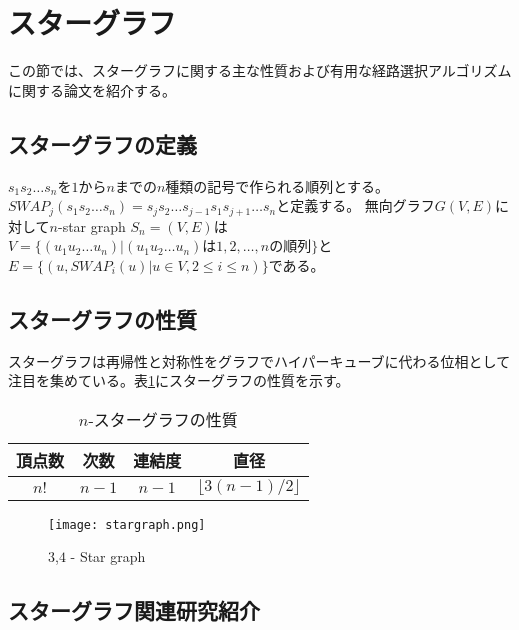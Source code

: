 \documentclass[11pt,a4j]{jsarticle}
\theoremstyle{plain}
\begin{document}
\newpage











\section{スターグラフ}
この節では、スターグラフに関する主な性質および有用な経路選択アルゴリズムに関する論文を紹介する。


\subsection{スターグラフの定義}
$s_1s_2\dots s_n$を$1$から$n$までの$n$種類の記号で作られる順列とする。$SWAP_j(s_1s_2\dots s_n)=s_js_2\dots s_{j-1}s_1s_{j+1}\dots s_n$と定義する。
無向グラフ$G(V,E)$に対して$n$-star graph $S_n=(V,E)$は$V=\{(u_1u_2\dots u_n)|(u_1u_2\dots u_n)は1,2,\dots ,nの順列\}$と$E=\{(u,SWAP_i(u) | u \in V, 2 \leq i \leq n )\}$である。


\subsection{スターグラフの性質}
スターグラフは再帰性と対称性をグラフでハイパーキューブに代わる位相として注目を集めている。表\ref{tab:sn_prop}にスターグラフの性質を示す。

\begin{table}[htb]
  \begin{center}
    \caption{$n$-スターグラフの性質}
    \begin{tabular}{|c|c|c|c|} \hline
      頂点数&次数&連結度&直径 \\ \hline 
      $n!$ & $n-1$&$n-1$& $\lfloor3(n - 1) /2 \rfloor$ \\ \hline
    \end{tabular}
        \label{tab:sn_prop}
  \end{center}
\end{table}

\begin{figure}
\centering
  \texttt{[image: stargraph.png]}
 \caption{$3$,$4$ - Star graph}
\label{fig:stargraph}
\end{figure}




\subsection{スターグラフ関連研究紹介}
\end{document}
